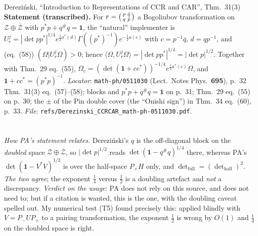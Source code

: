 \documentclass[11pt]{article}
\newcommand{\Pp}{P_+}\newcommand{\Pm}{P_-}
\providecommand{\Om}{\Omega}\providecommand{\Gm}{\Gamma}\providecommand{\Qt}{\widetilde Q}
\providecommand{\ip}[2]{\langle #1,#2\rangle}\providecommand{\one}{\mathbf 1}
\begin{document}
\begin{citedbox}{Derezi\'nski, ``Introduction to Representations of CCR and CAR'', Thm.~31(3)}
\textbf{Statement (transcribed).}  For $r=\begin{psmallmatrix}p&\bar q\\ q&\bar
p\end{psmallmatrix}$ a Bogoliubov transformation on $\mathcal Z\oplus\overline{\mathcal Z}$ with
$p^*p+q^{\#}q=\one$, the ``natural'' implementer is
$U^j_r=|\det pp^*|^{1/4}e^{\frac12a^*(d)}\Gm((p^*)^{-1})e^{-\frac12a(c)}$ with $c=p^{-1}\bar q$,
$d=qp^{-1}$, and (eq.~(58)) $(\Om|U^j_r\Om)>0$; hence
$\ip\Om{U^j_r\Om}=|\det pp^*|^{1/4}=|\det p|^{1/2}$.  Together with Thm.~29 eq.~(55),
$\Om_c=(\det(\one+cc^*))^{-1/4}e^{\frac12a^*(c)}\Om$, and $\one+cc^*=(p^*p)^{-1}$.
\emph{Locator}: \texttt{math-ph/0511030} (Lect.\ Notes Phys.\ \textbf{695}), p.~32 Thm.~31(3)
eq.~(57)--(58); blocks and $p^*p+q^{\#}q=\one$ on p.~31; Thm.~29 eq.~(55) on p.~30; the $\pm$ of the
Pin double cover (the ``Onishi sign'') in Thm.~34 eq.~(60), p.~33.
\emph{File}: \texttt{refs/Derezinski\_CCRCAR\_math-ph-0511030.pdf}.\\
\\[2pt]
\\
\emph{How PA's statement relates.}  Derezi\'nski's $q$ is the off-diagonal block on the
\emph{doubled} space $\mathcal Z\oplus\overline{\mathcal Z}$, so $|\det p|^{1/2}$ reads
$\det(\one-q^{\#}q)^{1/4}$ there, whereas PA's $\det(\one-V^*V)^{1/2}$ is over the half-space
$\Pp H$ only, and $\det_{\text{full}}=(\det_{\text{half}})^2$.  \emph{The two agree}; the exponent
$\frac14$ versus $\frac12$ is a doubling artefact and \emph{not} a discrepancy.
\emph{Verdict on the usage}: PA does not rely on this source, and does not need to; but if a
citation is wanted, this is the one, with the doubling caveat spelled out.  My numerical test (T5)
found precisely this: applied blindly with $V=\Pm U\Pp$ to a pairing transformation, the exponent
$\frac12$ is wrong by $O(1)$ and $\frac14$ on the doubled space is right.
\end{citedbox}
\end{document}
